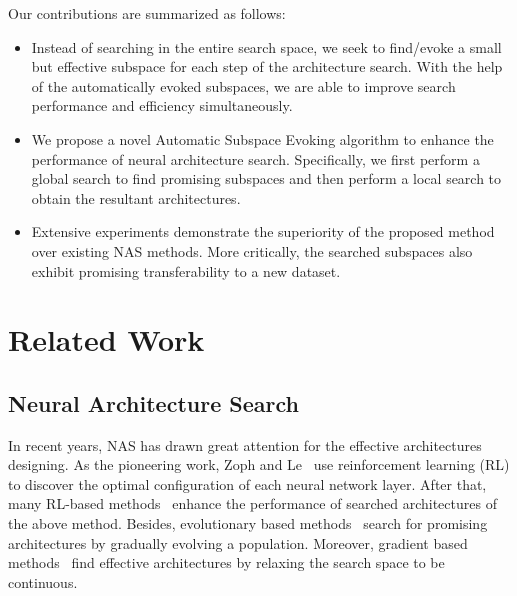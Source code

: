 \documentclass[lettersize,journal]{IEEEtran}
\begin{document}
Our contributions are summarized as follows:
\begin{itemize}
    \item 
    Instead of searching in the entire search space, we seek to find/evoke a small but effective subspace for each step of the architecture search.
    With the help of the automatically evoked subspaces, we are able to improve search performance and efficiency simultaneously.
    
    \item We propose a novel Automatic Subspace Evoking algorithm to enhance the performance of neural architecture search. 
    Specifically, we first perform a global search to find promising subspaces and then perform a local search to obtain the resultant architectures.
    
    \item Extensive experiments demonstrate the superiority of the proposed method over existing NAS methods. More critically, the searched subspaces also exhibit promising transferability to a new dataset.
\end{itemize}

\section{Related Work}

\subsection{Neural Architecture Search}

In recent years, NAS has drawn great attention for the effective architectures designing.
As the pioneering work, Zoph and Le~\cite{zoph2016neural} use reinforcement learning (RL) to discover the optimal configuration of each neural network layer.
After that, many RL-based methods~\cite{baker2016designing,guo2021towards,chen2021contrastive,tang2021autopedestrian} enhance the performance of searched architectures of the above method.
Besides, evolutionary based methods~\cite{lu2020neural,chen2021oneshot,chen2021autoformer,dai2021fbnetv3,liu2022block} search for promising architectures by gradually evolving a population.
Moreover, gradient based methods~\cite{liu2018darts,chen2021drnas,xia2020revealing,nguyen2020constrained,yang2022video} find effective architectures by relaxing the search space to be continuous.
\end{document}
